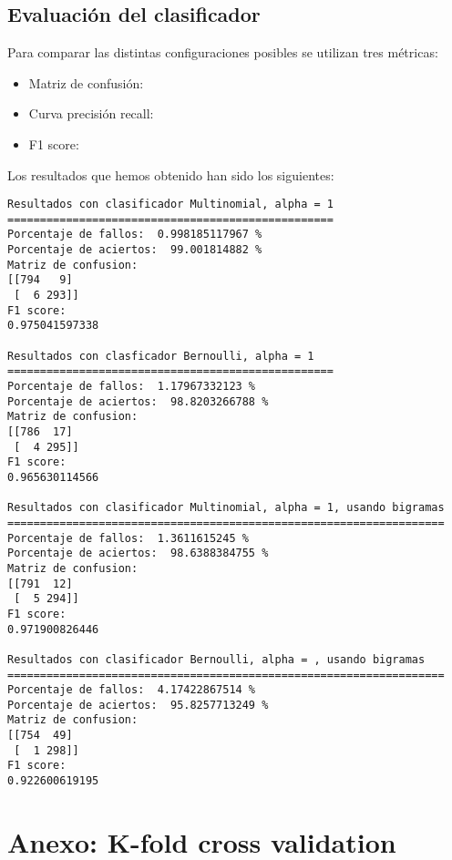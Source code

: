 \subsection{Evaluaci\'on del clasificador}
Para comparar las distintas configuraciones posibles se utilizan tres
m\'etricas:
\begin{itemize}
	\item Matriz de confusi\'on:
	\item Curva precisi\'on recall:
	\item F1 score:
\end{itemize}
Los resultados que hemos obtenido han sido los siguientes:
\begin{verbatim}
Resultados con clasificador Multinomial, alpha = 1
==================================================
Porcentaje de fallos:  0.998185117967 %
Porcentaje de aciertos:  99.001814882 %
Matriz de confusion:
[[794   9]
 [  6 293]]
F1 score:
0.975041597338

Resultados con clasficador Bernoulli, alpha = 1
==================================================
Porcentaje de fallos:  1.17967332123 %
Porcentaje de aciertos:  98.8203266788 %
Matriz de confusion:
[[786  17]
 [  4 295]]
F1 score:
0.965630114566

Resultados con clasificador Multinomial, alpha = 1, usando bigramas
===================================================================
Porcentaje de fallos:  1.3611615245 %
Porcentaje de aciertos:  98.6388384755 %
Matriz de confusion:
[[791  12]
 [  5 294]]
F1 score:
0.971900826446

Resultados con clasificador Bernoulli, alpha = , usando bigramas
===================================================================
Porcentaje de fallos:  4.17422867514 %
Porcentaje de aciertos:  95.8257713249 %
Matriz de confusion:
[[754  49]
 [  1 298]]
F1 score:
0.922600619195
\end{verbatim}

\section{Anexo: K-fold cross validation}

